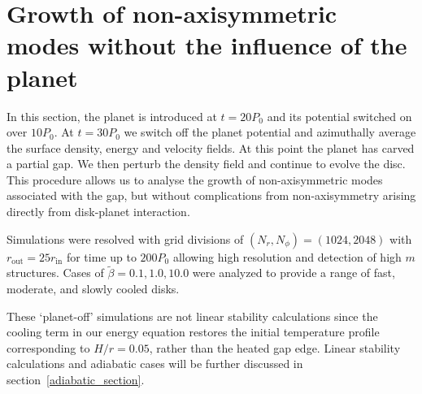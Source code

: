 \section{Growth of non-axisymmetric modes without the influence of the
  planet}
In this section, the planet is introduced at $t=20P_0$ and 
its potential switched on over $10P_0$. At $t=30P_0$ we switch off the
planet potential and azimuthally average the surface density, energy
and velocity fields. At this point the planet has carved a partial
gap. We then perturb the density field and continue to 
evolve the disc. This procedure allows us to analyse the growth of
non-axisymmetric modes associated with the gap, but without
complications from non-axisymmetry arising directly from disk-planet
interaction.

Simulations were resolved with grid divisions of $(N_r,N_{\phi})=(1024,2048)$ with $r_{\mathrm{out}}=25r_{\mathrm{in}}$ for time up to $200P_0$ allowing high resolution and detection of high $m$ structures. Cases of $\tilde{\beta}=0.1,1.0,10.0$ were analyzed to provide a range of fast, moderate, and slowly cooled disks.

These `planet-off' simulations are not linear stability calculations
since the cooling term in our energy equation restores the initial temperature profile corresponding to $H/r=0.05$, rather than the heated gap edge. Linear stability calculations and adiabatic cases will be further discussed in section~\ref{adiabatic_section}.





